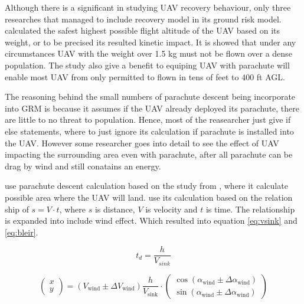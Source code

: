 \documentclass[12pt]{report}
\begin{document}
            Although there is a significant in studying UAV recovery behaviour, only three researches that managed to
            include recovery model in its ground risk model. \cite{shelley_model_2016} calculated the safest highest
            possible flight altitude of the UAV based on its weight, or to be precised its resulted kinetic impact. It
            is showed that under any circumstances UAV with the weight over 1.5 kg must not be flown over a dense
            population. The study also give a benefit to equiping UAV with parachute will enable most UAV from only
            permitted to flown in tens of feet to 400 ft \ac{AGL}.

            The reasoning behind the small numbers of parachute descent being incorporate into GRM is because it assumes
            if the UAV already deployed its parachute, there are little to no threat to population. Hence, most of the
            reasearcher just give if else statements, where to just ignore its calculation if parachute is installed
            into the UAV. However some researcher goes into detail to see the effect of UAV impacting the surrounding
            area even with parachute, after all parachute can be drag by wind and still conatains an energy.

            \cite{primatesta_ground_2020} use parachute descent calculation based on the study from
            \cite{bleier_risk_2015}, where it calculate possible area where the UAV will land. \cite{bleier_risk_2015}
            use its calculation based on the relation ship of \(s = V \cdot t\), where \(s\) is distance, \(V\) is
            velocity and \(t\) is time. The relationship is expanded into include wind effect. Which resulted into
            equation \ref{eq:vsink} and \ref{eq:bleir}.

            \begin{equation}\label{eq:vsink}
                t_d = \frac{h} {V_{sink}}
            \end{equation}

            \begin{equation}\label{eq:bleir}
                \begin{pmatrix}
                    x \\
                    y
                \end{pmatrix}
                =
                \left( V_{\text{wind}} \pm \Delta V_{\text{wind}} \right) \frac{h}{V_{\text{sink}}}
                \cdot
                \begin{pmatrix}
                    \cos \left( \alpha_{\text{wind}} \pm \Delta \alpha_{\text{wind}} \right) \\
                    \sin \left( \alpha_{\text{wind}} \pm \Delta \alpha_{\text{wind}} \right)
                \end{pmatrix}
            \end{equation}
\end{document}
